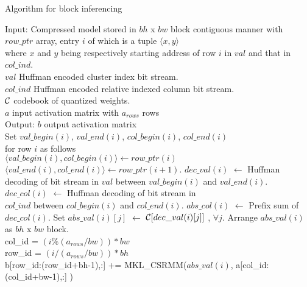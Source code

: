 \begin{algorithm}[t]
\caption{Algorithm for block inferencing}
\label{alg:pseudocode2}
\small
\begin{algorithmic}[1]
	\STATE Input: Compressed model stored in $bh$ x $bw$ block contiguous manner with \\
	$row\_ptr$ array, entry $i$ of which is a tuple $\langle x,y \rangle$ \\
	where $x$ and $y$ being respectively starting address of row $i$ in $val$ and 	that in $col\_ind$.\\
	$val$ Huffman encoded cluster index bit stream. \\
	$col\_ind$ Huffman encoded relative indexed column bit stream. \\
	${\cal C}$ codebook of quantized weights. \\
	$a$ input activation matrix with $a_{rows}$ rows\\
	\STATE Output: $b$ output  activation matrix\\
		 
		\STATE Set $val\_begin(i)$,  $val\_end(i)$, $col\_begin(i)$, $col\_end(i)$\\
		 for row $i$ as follows \\
		 \quad  \quad $\langle val\_begin(i), col\_begin(i) \rangle \leftarrow row\_ptr(i)$\\
		 \quad  \quad $\langle val\_end(i), col\_end(i) \rangle \leftarrow row\_ptr(i+1)$.
		\STATE $dec\_val(i)$ $\leftarrow$ Huffman decoding of bit stream in $val$ between $val\_begin(i)$ and  $val\_end(i)$.
		\STATE  $dec\_col(i)$ $\leftarrow$ Huffman decoding of bit stream in \\
		$col\_ind$ between $col\_begin(i)$ and  $col\_end(i)$.
		\STATE $abs\_col(i)$ $\leftarrow$  Prefix sum of $dec\_col(i)$.
		\STATE Set $abs\_val(i)[j]$ $\leftarrow$ ${\cal C} [dec\_val(i)[j]]$ , $\forall j$.
		\STATE Arrange $abs\_val(i)$ as $bh$ x $bw$ block. \\
		\STATE col\_id = $ ( i \% (a_{rows}/bw) ) * bw$  \\
		\STATE row\_id = $ ( i / (a_{rows}/bw) ) * bh$  \\
		\STATE b[row\_id:(row\_id+bh-1),:] += MKL\_CSRMM($abs\_val(i)$, a[col\_id:(col\_id+bw-1),:] ) \\
	\ENDFOR	
\end{algorithmic}
\end{algorithm}




